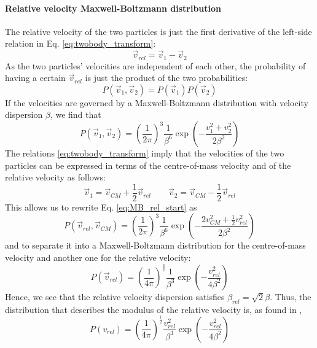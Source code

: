 \paragraph{Relative velocity Maxwell-Boltzmann distribution}
The relative velocity of the two particles is just the first derivative of the left-side relation in Eq. \eqref{eq:twobody_transform}:
\begin{equation}
	\vec{v}_{rel} = \vec{v}_1 - \vec{v}_2
\end{equation}
As the two particles' velocities are independent of each other, the probability of having a certain \(\vec{v}_{rel} \) is just the product of the two probabilities:
\begin{equation}
	P(\vec{v}_1, \vec{v}_2) = P(\vec{v}_1)P(\vec{v}_2)
\end{equation}
If the velocities are governed by a Maxwell-Boltzmann distribution with velocity dispersion \(\beta \), we find that
\begin{equation}\label{eq:MB_rel_start}
	P(\vec{v}_1, \vec{v}_2) = \left( \frac{1}{2\pi } \right)^3 \frac{1}{\beta ^6} \exp \left( -\frac{v_1^2 + v_2^2}{2\beta ^2} \right)  
\end{equation}
The relations \eqref{eq:twobody_transform} imply that the velocities of the two particles can be expressed in terms of the centre-of-mass velocity and of the relative velocity as follows:
\begin{equation}
	\vec{v}_1 = \vec{v}_{CM} + \frac{1}{2} \vec{v}_{rel}
	\qquad
	\vec{v}_2 = \vec{v}_{CM} - \frac{1}{2} \vec{v}_{rel} 
\end{equation}
This allows us to rewrite Eq. \eqref{eq:MB_rel_start} as
\begin{equation}
	P(\vec{v}_{rel} , \vec{v}_{CM} ) = \left( \frac{1}{2\pi } \right)^3 \frac{1}{\beta ^6} \exp \left( - \frac{2 v_{CM} ^2 + \frac{1}{2}v_{rel} ^2}{2\beta ^2} \right)  
\end{equation}
and to separate it into a Maxwell-Boltzmann distribution for the centre-of-mass velocity and another one for the relative velocity:
\begin{equation}
	P(\vec{v}_{rel} ) = \left( \frac{1}{4\pi } \right)^{\frac{3}{2}} \frac{1}{\beta ^3} \exp \left( - \frac{v_{rel} ^2}{4\beta ^2} \right)  
\end{equation}
Hence, we see that the relative velocity dispersion satisfies \(\beta _{rel}=\sqrt{2} \beta \). Thus, the distribution that describes the modulus of the relative velocity is, as found in \cite{Ferrer_2013},
\begin{equation}
	P(v_{rel} ) = \left( \frac{1}{4\pi } \right) ^{\frac{1}{2}} \frac{v_{rel} ^2}{\beta ^3} \exp \left( - \frac{v_{rel} ^2}{4\beta ^2} \right)  
\end{equation}